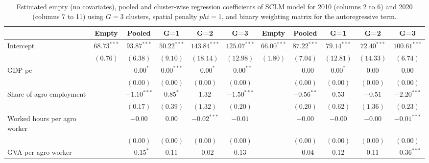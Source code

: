 
\begin{table}
\caption{Estimated empty (no covariates), pooled and cluster-wise regression coefficients of SCLM model for 2010 (columns 2 to 6) and 2020 (columns 7 to 11) using $G=$3 clusters, spatial penalty $phi=$1, and binary weighting matrix for the autoregressive term.}
\begin{center}
\begin{tabular}{l c c c c c c c c c c}
\hline
 & Empty & Pooled & G=1 & G=2 & G=3 & Empty & Pooled & G=1 & G=2 & G=3 \\
\hline
Intercept                         & $68.73^{***}$ & $93.87^{***}$ & $50.22^{***}$ & $143.84^{***}$ & $125.07^{***}$ & $66.00^{***}$ & $87.22^{***}$ & $79.14^{***}$ & $72.40^{***}$ & $100.61^{***}$ \\
                                  & $(0.76)$      & $(6.38)$      & $(9.10)$      & $(18.14)$      & $(12.98)$      & $(1.80)$      & $(7.04)$      & $(12.81)$     & $(14.33)$     & $(6.74)$       \\
GDP pc                            &               & $-0.00^{*}$   & $0.00^{***}$  & $-0.00^{*}$    & $-0.00^{**}$   &               & $-0.00$       & $0.00^{*}$    & $0.00$        & $0.00$         \\
                                  &               & $(0.00)$      & $(0.00)$      & $(0.00)$       & $(0.00)$       &               & $(0.00)$      & $(0.00)$      & $(0.00)$      & $(0.00)$       \\
Share of agro employment          &               & $-1.10^{***}$ & $0.85^{*}$    & $1.32$         & $-1.50^{***}$  &               & $-0.56^{**}$  & $0.53$        & $-0.51$       & $-2.20^{***}$  \\
                                  &               & $(0.17)$      & $(0.39)$      & $(1.32)$       & $(0.20)$       &               & $(0.20)$      & $(0.62)$      & $(1.36)$      & $(0.23)$       \\
Worked hours per agro worker      &               & $-0.00$       & $0.00$        & $-0.02^{***}$  & $-0.01$        &               & $-0.00$       & $-0.00$       & $-0.00$       & $-0.01^{***}$  \\
                                  &               & $(0.00)$      & $(0.00)$      & $(0.00)$       & $(0.00)$       &               & $(0.00)$      & $(0.00)$      & $(0.00)$      & $(0.00)$       \\
GVA per agro worker               &               & $-0.15^{*}$   & $0.11$        & $-0.02$        & $0.13$         &               & $-0.04$       & $0.12$        & $0.11$        & $-0.36^{***}$  \\

\end{tabular}
\end{center}
\end{table}
